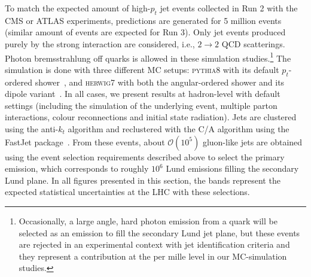 \documentclass[a4paper,11pt]{article}
\newcommand{\py}{{\textsc{pythia}}8\xspace}
\newcommand{\hw}{{\textsc{herwig}}7\xspace}
\begin{document}
To match the expected amount of high-$p_t$ jet events collected in Run 2 with the CMS or ATLAS experiments, predictions are generated for 5 million events (similar amount of events are expected for Run 3). Only jet events produced purely by the strong interaction are considered, i.e., $2\to 2$ QCD scatterings. Photon bremsstrahlung off quarks is allowed in these simulation studies.\footnote{Occasionally, a large angle, hard photon emission from a quark will be selected as an emission to fill the secondary Lund jet plane, but these events are rejected in an experimental context with jet identification criteria and they represent a contribution at the per mille level in our MC-simulation studies.} The simulation is done with three different MC setups: \py with its default $p_t$-ordered shower~\cite{Bierlich:2022pfr}, and \hw with both the angular-ordered shower and its dipole variant~\cite{Bellm:2019zci}. In all cases, we present results at hadron-level with default settings (including the simulation of the underlying event, multiple parton interactions, colour reconnections and initial state radiation). Jets are clustered using the anti-$k_t$ algorithm and reclustered with the C/A algorithm using the FastJet package~\cite{Cacciari:2005hq,Cacciari:2011ma}. From these events, about $\mathcal{O}(10^5)$ gluon-like jets are obtained using the event selection requirements described above to select the primary emission, which corresponds to roughly $10^6$ Lund emissions filling the secondary Lund plane. In all figures presented in this section, the bands represent the expected statistical uncertainties at the LHC with these selections.
\end{document}
